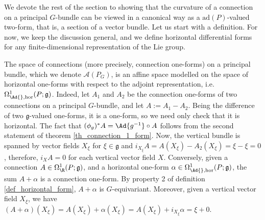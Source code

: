 We devote the rest of the section to showing that the curvature of a connection on a principal \(G\)-bundle can be viewed in a canonical way as a \(\mathrm{ad}(P)\)-valued two-form, that is, a section of a vector bundle. Let us start with a definition. For now, we keep the discussion general, and we define horizontal differential forms for any finite-dimensional representation of the Lie group. 

The space of connections (more precisely, connection one-forms) on a principal bundle, which we denote \(\mathscr{A}(P_G)\), is an affine space modelled on the space of horizontal one-forms with respect to the adjoint representation, i.e. \(\Omega^1_{\Ad{}, \mathrm{hor}}(P; \mathfrak{g})\). Indeed, let \(A_1\) and \(A_2\) be the connection one-forms of two connections on a principal \(G\)-bundle, and let \(A:=A_1-A_2\). Being the difference of two \(\mathfrak{g}\)-valued one-forms, it is a one-form, so we need only check that it is horizontal. The fact that \((\phi_g)^*A=\Ad{g^{-1}}\circ A\) follows from the second statement of theorem \ref{th_connection_1_form}. Now, the vertical bundle is spanned by vector fields \(X_\xi\) for \(\xi \in \mathfrak{g}\) and \(i_{X_\xi}A=A(X_\xi)-A_2(X_\xi)=\xi-\xi=0\), therefore, \(i_X A=0\) for each vertical vector field \(X\). Conversely, given a connection \(A \in \Omega^1_\R(P; \mathfrak{g})\), and a horizontal one-form \(\alpha \in \Omega^1_{\Ad{}, \mathrm{hor}}(P;\mathfrak{g})\), the sum \(A+\alpha\) is a connection one-form. By property 2 of definition \ref{def_horizontal_form}, \(A+\alpha\) is \(G\)-equivariant. Moreover, given a vertical vector field \(X_\xi\), we have \((A+\alpha)(X_\xi)=A(X_\xi)+\alpha(X_\xi)=A(X_\xi)+i_{X_\xi}\alpha=\xi+0\).    

